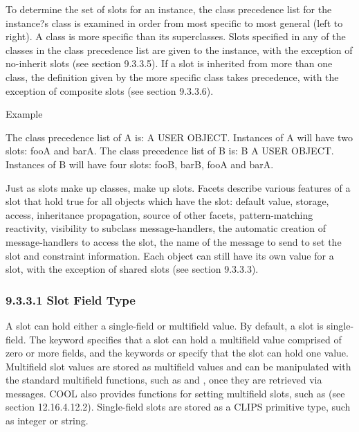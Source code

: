 \documentclass[letterpaper,10pt,english]{sphinxmanual}
\begin{document}
To determine the set of slots for an instance, the class precedence list
for the instance?s class is examined in order from most specific to most
general (left to right). A class is more specific than its superclasses.
Slots specified in any of the classes in the class precedence list are
given to the instance, with the exception of no-inherit slots (see
section 9.3.3.5). If a slot is inherited from more than one class, the
definition given by the more specific class takes precedence, with the
exception of composite slots (see section 9.3.3.6).

Example

\begin{sphinxVerbatim}[commandchars=\\\{\}]
   
   
   

   
   
   
\end{sphinxVerbatim}

The class precedence list of A is: A USER OBJECT. Instances of A will
have two slots: fooA and barA. The class precedence list of B is: B A
USER OBJECT. Instances of B will have four slots: fooB, barB, fooA and
barA.

Just as slots make up classes,  make up slots. Facets describe
various features of a slot that hold true for all objects which have the
slot: default value, storage, access, inheritance propagation, source of
other facets, pattern-matching reactivity, visibility to subclass
message-handlers, the automatic creation of message-handlers to access
the slot, the name of the message to send to set the slot and constraint
information. Each object can still have its own value for a slot, with
the exception of shared slots (see section 9.3.3.3).


\subsubsection{9.3.3.1 Slot Field Type}
\label{\detokenize{cool:slot-field-type}}
A slot can hold either a single-field or multifield value. By default, a
slot is single-field. The keyword  specifies that a slot
can hold a multifield value comprised of zero or more fields, and the
keywords  or  specify that the slot can hold one
value. Multifield slot values are stored as multifield values and can be
manipulated with the standard multifield functions, such as  and
, once they are retrieved via messages. COOL also provides
functions for setting multifield slots, such as  (see
section 12.16.4.12.2). Single-field slots are stored as a CLIPS
primitive type, such as integer or string.
\end{document}
